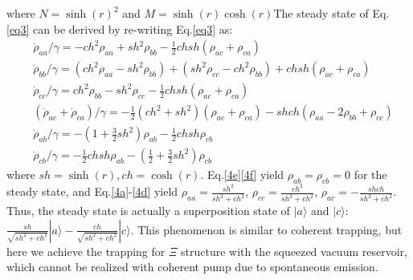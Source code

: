 \documentclass{article}
\begin{document}
where $N=\sinh(r)^2$ and $M=\sinh(r)\cosh(r)$The steady state of Eq.\eqref{eq3} can be derived by re-writing Eq.\eqref{eq3} as:
\begin{subequations}
\begin{align}
&\dot{\rho}_{aa}/\gamma=-ch^{2}\rho_{aa}+sh{}^{2}\rho_{bb}-\frac{1}{2}chsh(\rho_{ac}+\rho_{ca})\label{4a} \\
& \dot{\rho}_{bb}/\gamma=(ch^{2}\rho_{aa}-sh^{2}\rho_{bb})+(sh^{2}\rho_{cc}-ch^{2}\rho_{bb})+chsh(\rho_{ac}+\rho_{ca})\label{4b}\\
&\dot{\rho}_{cc}/\gamma=ch^{2}\rho_{bb}-sh^{2}\rho_{cc}-\frac{1}{2}chsh(\rho_{ac}+\rho_{ca})\label{4c}\\
&(\dot{\rho}_{ac}+\dot{\rho}_{ca})/\gamma=-\frac{1}{2}(ch^{2}+sh^{2})(\rho_{ac}+\rho_{ca})-shch(\rho_{aa}-2\rho_{bb}+\rho_{cc})\label{4d}\\
&\dot{\rho}_{ab}/\gamma=-(1+\frac{3}{2}sh^{2})\rho_{ab}-\frac{1}{2}chsh\rho_{cb}\label{4e}\\
&\dot{\rho}_{cb}/\gamma=-\frac{1}{2}chsh\rho_{ab}-(\frac{1}{2}+\frac{3}{2}sh^{2})\rho_{cb}\label{4f}
\end{align}
\end{subequations}
where $sh=\sinh(r), ch=\cosh(r)$. Eq.\eqref{4e}\eqref{4f} yield $\rho_{ab}=\rho_{cb}=0$ for the steady state, and Eq.\eqref{4a}-\eqref{4d} yield $\rho_{aa}=\frac{sh^{2}}{sh^{2}+ch^{2}}$, $\rho_{cc}=\frac{ch^{2}}{sh^{2}+ch^{2}}$, $\rho_{ac}=-\frac{shch}{sh^{2}+ch^{2}}$. Thus, the steady state is actually a superposition state of $|a\rangle$ and $|c\rangle$: $\frac{sh}{\sqrt{sh^{2}+ch^{2}}}|a\rangle-\frac{ch}{\sqrt{sh^{2}+ch^{2}}}|c\rangle$. This phenomenon is similar to coherent trapping, but here we achieve the trapping for $\Xi$ structure with the squeezed vacuum reservoir, which cannot be realized with coherent pump due to spontaneous emission.
\end{document}

